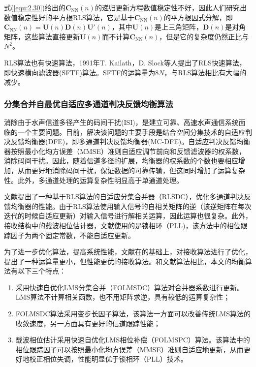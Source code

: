 式(\ref{equ:2.30})给出的$\mathbf{C}_{\mathrm{NN}}(n)$的递归更新方程数值稳定性不好，因此人们研究出数值稳定性好的平方根RLS算法，它是基于$\mathbf{C}_{\mathrm{NN}}(n)$的平方根因式分解，即$\mathbf{C}_{\mathrm{NN}}(n)=\mathbf{U}(n)\mathbf{D}(n){\mathbf{U}}'(n)$，其中$\mathbf{U}(n)$是上三角矩阵，$\mathbf{D}(n)$是对角矩阵，这些算法直接更新$\mathbf{U}(n)$而不计算$\mathbf{C}_{\mathrm{NN}}(n)$，但是它的复杂度仍然正比与$N^2$。

RLS算法也有快速算法，1991年T. Kailath，D.
Slock\citep{Cioffi1984,Slock1991,Slock1989,Slock1992,Benallal1989}等人提出了RLS快速算法，即快速横向滤波器(SFTF)算法。SFTF的运算量为$8N$，与RLS算法相比有大幅的减少。
\subsubsection*{分集合并自最优自适应多通道判决反馈均衡算法}
消除由于水声信道多径产生的码间干扰(ISI)，是建立可靠、高速水声通信系统面临的一个主要问题。目前，解决该问题的主要手段是结合空间分集技术的自适应判决反馈均衡器(DFE)，即多通道判决反馈均衡器(MC-DFE)\citep{Geller1996,Capellano1998,Geller1995,stojanovic1993,catipovic1996spatial,Ritcey1992,Gooch1988,Monsen1977,Balaban1992,Stojanvoic1993adaptive}。自适应判决反馈均衡器按照最小化均方误差（MMSE）准则自适应调节前向和反馈滤波器的权系数，消除码间干扰。因此，随着信道多径的扩展，均衡器的权系数的个数也要相应增加，从而更好地消除码间干扰，保证数据的可靠传输，但这同时增加了运算复杂性。此外，多通道处理的运算复杂性明显高于单通道处理。

文献提出了一种基于RLS算法的自适应分集合并器（RLSDC），优化多通道判决反馈均衡器的性能。由于RLS算法使用输入信号的自相关矩阵的逆（该逆矩阵在每次迭代的时候自适应更新）对输入信号进行解相关运算，因此运算也很复杂。此外，接收结构中的载波相位估计器，文献使用的是锁相环（PLL)，该方法中的相位跟踪因子为两个固定常数，不能自适应更新。

为了进一步优化算法，提高系统性能，文献在的基础上，对接收算法进行了优化，提出了一种运算量更小，但性能更优的接收算法。和文献算法相比，本文的均衡算法有以下三个特点：
\begin{enumerate}
    \item
       采用快速自优化LMS分集合并（FOLMSDC）算法对合并器系数进行更新。LMS算法不计算相关函数，也不用矩阵求逆，具有较低的运算复杂性；
   \item
       FOLMSDC算法采用变步长因子算法，该算法一方面可以改善传统LMS算法的收敛速度，另一方面具有更好的信道跟踪性能；
   \item  载波相位估计采用快速自优化LMS相位补偿（FOLMSPC）算法。该算法中的相位跟踪因子可以按照最小化均方误差（MMSE）准则自适应地更新，从而更好地校正相位失调，性能明显优于锁相环（PLL）技术。
\end{enumerate}

